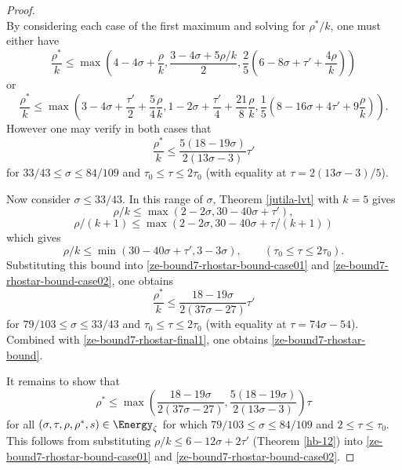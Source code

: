 \begin{proof}
\[\]
By considering each case of the first maximum and solving for $\rho^*/k$, one must either have
\begin{equation}\label{ze-bound7-rhostar-bound-case01}
\frac{\rho^*}{k} \le \max(4 - 4\sigma + \frac{\rho}{k}, \frac{3 - 4\sigma + 5\rho/k}{2}, \frac{2}{5}(6 - 8\sigma + \tau' + \frac{4\rho}{k}))
\end{equation}
or
\begin{equation}\label{ze-bound7-rhostar-bound-case02}
\frac{\rho^*}{k} \le \max(3 - 4\sigma + \frac{\tau'}{2} + \frac{5}{4}\frac{\rho}{k}, 1 - 2\sigma + \frac{\tau'}{4} + \frac{21}{8}\frac{\rho}{k}, \frac{1}{5}(8 - 16\sigma + 4\tau' + 9\frac{\rho}{k})).
\end{equation}
However one may verify in both cases that
\begin{equation}\label{ze-bound7-rhostar-final1}
\frac{\rho^*}{k} \le \frac{5(18 - 19\sigma)}{2(13\sigma - 3)}\tau'
\end{equation}
for $33/43\le \sigma \le 84/109$ and $\tau_0 \le \tau \le 2\tau_0$ (with equality at $\tau = 2(13\sigma - 3)/5$).

Now consider $\sigma \le 33/43$. In this range of $\sigma$, Theorem \ref{jutila-lvt} with $k = 5$ gives
\[
\rho/k \le \max(2 - 2\sigma, 30 - 40\sigma + \tau'),
\]
\[
\rho/(k + 1) \le \max(2 - 2\sigma, 30 - 40\sigma + \tau/(k + 1))
\]
which gives
\[
\rho/k \le \min(30 - 40\sigma + \tau', 3 - 3\sigma),\qquad (\tau_0 \le \tau \le 2\tau_0).
\]
Substituting this bound into \eqref{ze-bound7-rhostar-bound-case01} and \eqref{ze-bound7-rhostar-bound-case02}, one obtains
\[
\frac{\rho^*}{k} \le \frac{18 - 19\sigma}{2(37\sigma - 27)}\tau'
\]
for $79/103 \le \sigma \le 33/43$ and $\tau_0 \le \tau \le 2\tau_0$ (with equality at $\tau = 74\sigma - 54$). Combined with \eqref{ze-bound7-rhostar-final1}, one obtains \eqref{ze-bound7-rhostar-bound}.

It remains to show that
\begin{equation}\label{ze-bound7-rhostar-zeta-bound}
\rho^* \le \max\left(\frac{18 - 19\sigma}{2(37\sigma - 27)}, \frac{5(18 - 19\sigma)}{2(13\sigma - 3)}\right)\tau
\end{equation}
for all $(\sigma, \tau, \rho, \rho^*, s) \in \Energy_\zeta$ for which $79/103 \le \sigma \le 84/109$ and $2 \le \tau \le \tau_0$. This follows from substituting $\rho/k \le 6 - 12\sigma + 2\tau'$ (Theorem \ref{hb-12}) into \eqref{ze-bound7-rhostar-bound-case01} and \eqref{ze-bound7-rhostar-bound-case02}.
\end{proof}


